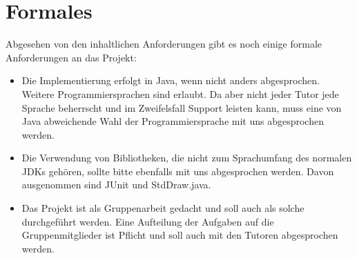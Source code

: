 \documentclass{programmierpraktikum}
\begin{document}
\section{Formales}
Abgesehen von den inhaltlichen Anforderungen gibt es noch einige formale Anforderungen an das Projekt:
\begin{itemize}
  \item Die Implementierung erfolgt in Java, wenn nicht anders abgesprochen. Weitere
    Programmiersprachen sind erlaubt. Da aber nicht jeder Tutor jede Sprache beherrscht und im
    Zweifelsfall Support leisten kann, muss eine von Java abweichende Wahl der Programmiersprache
    mit uns abgesprochen werden.
  \item Die Verwendung von Bibliotheken, die nicht zum Sprachumfang des normalen JDKs gehören,
    sollte bitte ebenfalls mit uns abgesprochen werden. Davon ausgenommen sind JUnit und
    StdDraw.java.
  \item Das Projekt ist als Gruppenarbeit gedacht und soll auch als solche durchgeführt werden.
    Eine Aufteilung der Aufgaben auf die Gruppenmitglieder ist Pflicht und soll auch mit den
    Tutoren abgesprochen werden.
\end{itemize}
%
\end{document}
